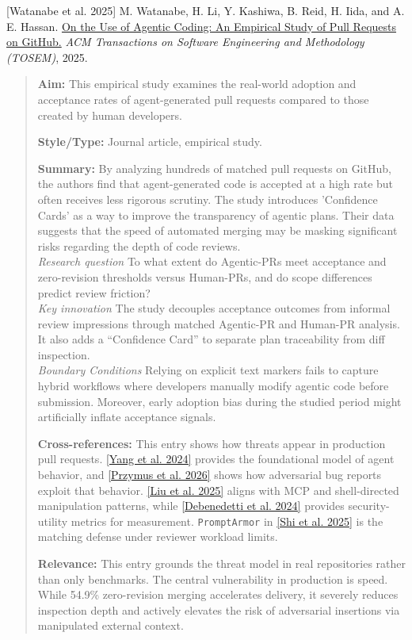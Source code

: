 \documentclass[11pt, a4paper]{article}
\begin{document}
\newpage
\noindent \hypertarget{p6}{[Watanabe et al. 2025]} M. Watanabe, H. Li, Y. Kashiwa, B. Reid, H. Iida, and A. E. Hassan. \href{https://arxiv.org/abs/2509.14745}{On the Use of Agentic Coding: An Empirical Study of Pull Requests on GitHub.} \textit{ACM Transactions on Software Engineering and Methodology (TOSEM)}, 2025.
\begin{quote}
\textbf{Aim:} This empirical study examines the real-world adoption and acceptance rates of agent-generated pull requests compared to those created by human developers.

\vspace{0.5em}
\textbf{Style/Type:} Journal article, empirical study.

\vspace{0.5em}
\textbf{Summary:} By analyzing hundreds of matched pull requests on GitHub, the authors find that agent-generated code is accepted at a high rate but often receives less rigorous scrutiny. The study introduces 'Confidence Cards' as a way to improve the transparency of agentic plans. Their data suggests that the speed of automated merging may be masking significant risks regarding the depth of code reviews. \\ \textit{Research question} To what extent do Agentic-PRs meet acceptance and zero-revision thresholds versus Human-PRs, and do scope differences predict review friction? \\ \textit{Key innovation} The study decouples acceptance outcomes from informal review impressions through matched Agentic-PR and Human-PR analysis. It also adds a ``Confidence Card'' to separate plan traceability from diff inspection. \\ \textit{Boundary Conditions} Relying on explicit text markers fails to capture hybrid workflows where developers manually modify agentic code before submission. Moreover, early adoption bias during the studied period might artificially inflate acceptance signals.

\vspace{0.5em}
\textbf{Cross-references:} This entry shows how threats appear in production pull requests. \hyperlink{p7}{[Yang et al. 2024]} provides the foundational model of agent behavior, and \hyperlink{p4}{[Przymus et al. 2026]} shows how adversarial bug reports exploit that behavior. \hyperlink{p3}{[Liu et al. 2025]} aligns with MCP and shell-directed manipulation patterns, while \hyperlink{p1}{[Debenedetti et al. 2024]} provides security-utility metrics for measurement. \texttt{PromptArmor} in \hyperlink{p5}{[Shi et al. 2025]} is the matching defense under reviewer workload limits.

\vspace{0.5em}
\textbf{Relevance:} This entry grounds the threat model in real repositories rather than only benchmarks. The central vulnerability in production is speed. While 54.9\% zero-revision merging accelerates delivery, it severely reduces inspection depth and actively elevates the risk of adversarial insertions via manipulated external context.
\end{quote}
\end{document}
